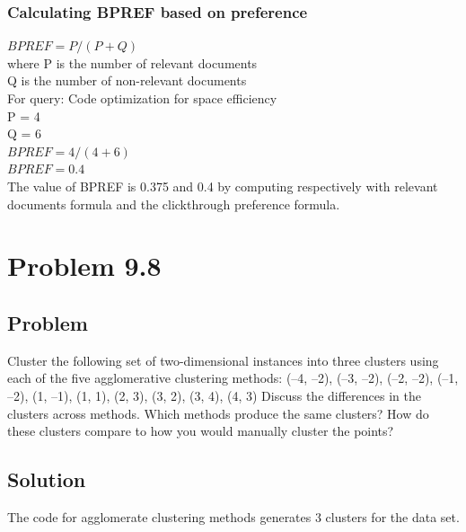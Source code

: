 \documentclass[12pt]{report}
\begin{document}
\subsection{Calculating BPREF based on preference}

$BPREF = P /( P + Q)$\\
where P is the number of relevant documents \\
          Q is the number of non-relevant documents\\
For query: Code optimization for space efficiency\\
P = 4\\
Q = 6\\
$BPREF = 4/(4+6)$\\
$BPREF = 0.4$\\

The value of BPREF is 0.375 and 0.4 by computing respectively with relevant documents formula and the clickthrough preference formula.
\chapter{Problem 9.8}
\section{Problem}
Cluster the following set of two-dimensional instances into three clusters using each of the five agglomerative clustering methods:
(–4, –2), (–3, –2), (–2, –2), (–1, –2), (1, –1), (1, 1), (2, 3), (3, 2), (3, 4), (4, 3)
Discuss the differences in the clusters across methods. Which methods produce the same clusters? How do these clusters compare to how you would manually cluster the points?
\section{Solution}
The code for agglomerate clustering methods generates 3 clusters for the data set.
\end{document}
